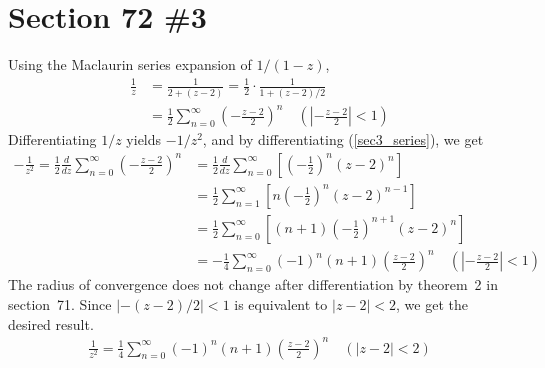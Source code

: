 \documentclass{scrartcl}
\begin{document}
\section{Section 72 \#3}
Using the Maclaurin series expansion of \(1 / (1 - z)\),
\begin{align}
  \nonumber \frac{1}{z}
  \nonumber &= \frac{1}{2 + (z - 2)}
  \nonumber = \frac{1}{2} \cdot \frac{1}{1 + (z - 2) / 2} \\
  \label{sec3_series} &= \frac{1}{2} \sum^\infty_{n = 0} \left( -\frac{z - 2}{2} \right)^n \quad \left( \left| -\frac{z - 2}{2} \right| < 1 \right)
\end{align}
Differentiating \(1 / z\) yields \(-1 / z^2\), and by differentiating (\ref{sec3_series}), we get
\begin{align*}
  -\frac{1}{z^2}
  = \frac{1}{2} \frac{d}{dz} \sum^\infty_{n = 0} \left( -\frac{z - 2}{2} \right)^n
  &= \frac{1}{2} \frac{d}{dz} \sum^\infty_{n = 0} \left[ \left( -\frac{1}{2} \right)^n (z - 2)^n \right] \\
  &= \frac{1}{2} \sum^\infty_{n = 1} \left[ n \left( -\frac{1}{2} \right)^n (z - 2)^{n - 1} \right] \\
  &= \frac{1}{2} \sum^\infty_{n = 0} \left[ (n + 1) \left( -\frac{1}{2} \right)^{n + 1} (z - 2)^n \right] \\
  &= -\frac{1}{4} \sum^\infty_{n = 0} (-1)^n (n + 1) \left( \frac{z - 2}{2} \right)^n \quad \left( \left| -\frac{z - 2}{2} \right| < 1 \right)
\end{align*}
The radius of convergence does not change after differentiation by theorem~2 in section~71.
Since \(|-(z - 2) / 2| < 1\) is equivalent to \(|z - 2| < 2\), we get the desired result.
\begin{align*}
  \frac{1}{z^2} = \frac{1}{4} \sum^\infty_{n = 0} (-1)^n (n + 1) \left( \frac{z - 2}{2} \right)^n \quad (|z - 2| < 2)
\end{align*}
\end{document}
